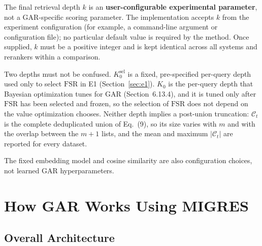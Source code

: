 \documentclass[11pt,a4paper]{article}
\begin{document}
The final retrieval depth $k$ is an \textbf{user-configurable experimental parameter}, not a GAR-specific scoring parameter. The implementation accepts $k$ from the experiment configuration (for example, a command-line argument or configuration file); no particular default value is required by the method. Once supplied, $k$ must be a positive integer and is kept identical across all systems and rerankers within a comparison.

Two depths must not be confused. $K_0^{\mathrm{sel}}$ is a fixed, pre-specified per-query depth used only to select $\mathrm{FSR}$ in E1 (Section~\ref{sec:e1}). $K_0$ is the per-query depth that Bayesian optimization tunes for GAR (Section~6.13.4), and it is tuned only after $\mathrm{FSR}$ has been selected and frozen, so the selection of $\mathrm{FSR}$ does not depend on the value optimization chooses. Neither depth implies a post-union truncation: $\mathcal{C}_t$ is the complete deduplicated union of Eq.~(9), so its size varies with $m$ and with the overlap between the $m+1$ lists, and the mean and maximum $|\mathcal{C}_t|$ are reported for every dataset.

The fixed embedding model and cosine similarity are also configuration choices, not learned GAR hyperparameters.

\section{How GAR Works Using MIGRES}

\subsection{Overall Architecture}
\end{document}
